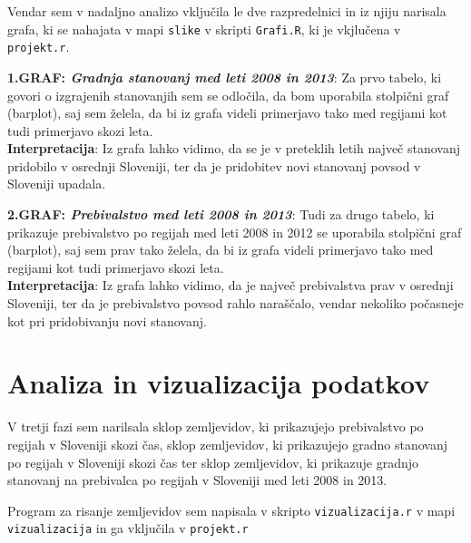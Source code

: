 \documentclass[11pt,a4paper]{article}
\begin{document}
Vendar sem v nadaljno analizo vključila le dve razpredelnici in iz njiju narisala grafa, ki se nahajata v mapi \verb|slike| v skripti \verb|Grafi.R|, ki je vkjlučena v \verb|projekt.r|.

\newpage
\textbf{1.GRAF: \emph{Gradnja stanovanj med leti 2008 in 2013}}: Za prvo tabelo, ki govori o izgrajenih stanovanjih sem se odločila, da bom uporabila stolpični graf (barplot), saj sem želela, da bi iz grafa videli primerjavo tako med regijami kot tudi primerjavo skozi leta.\\
\newline
\textbf{Interpretacija}: Iz grafa lahko vidimo, da se je v preteklih letih največ stanovanj pridobilo v osrednji Sloveniji, ter da je pridobitev novi stanovanj povsod v Sloveniji upadala.
\newline
{}

\newpage
\textbf{2.GRAF: \emph{Prebivalstvo med leti 2008 in 2013}}: Tudi za drugo tabelo, ki prikazuje prebivalstvo po regijah med leti 2008 in 2012 se uporabila stolpični graf (barplot), saj sem prav tako želela, da bi iz grafa videli primerjavo tako med regijami kot tudi primerjavo skozi leta.\\
\newline
\textbf{Interpretacija}: Iz grafa lahko vidimo, da je največ prebivalstva prav v osrednji Sloveniji, ter da je prebivalstvo povsod rahlo naraščalo, vendar nekoliko počasneje kot pri pridobivanju novi stanovanj.
\newline
{}

\newpage
\section{Analiza in vizualizacija podatkov}

V tretji fazi sem narilsala sklop zemljevidov, ki prikazujejo prebivalstvo po regijah v Sloveniji skozi čas, sklop zemljevidov, ki prikazujejo gradno stanovanj po regijah v Sloveniji skozi čas ter sklop zemljevidov, ki prikazuje gradnjo stanovanj na prebivalca po regijah v Sloveniji med leti 2008 in 2013.
\newline

Program za risanje zemljevidov sem napisala v skripto \verb|vizualizacija.r| v mapi \verb|vizualizacija| in ga vključila v \verb|projekt.r|
\newline
\end{document}
